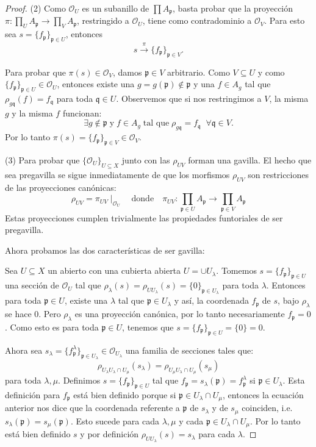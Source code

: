 \documentclass[10pt]{report}
\theoremstyle{plain}\newtheorem{thm}{Teorema}
\theoremstyle{plain}\newtheorem{lem}[thm]{Lema}
\theoremstyle{plain}\newtheorem*{conjecture*}{Conjetura}
\theoremstyle{plain}\newtheorem{cor}[thm]{Corolario}
\theoremstyle{definition}\newtheorem{defin}{Definici\'on}
\theoremstyle{definition}\newtheorem*{defin*}{Definici\'on}
\theoremstyle{remark}\newtheorem{claim}{Proposici\'on}
\theoremstyle{remark}\newtheorem*{claim*}{Proposici\'on}
\theoremstyle{remark}\newtheorem*{eje*}{$\mathbf{Ejercicio}$}
\theoremstyle{remark}\newtheorem{exa}{Ejemplo}
\newcommand{\p}{\mathfrak{p}} %
\newcommand{\q}{\mathfrak{q}} %
\newcommand{\OO}{\mathcal{O}} %
\newcommand{\ra}{\rightarrow}
\begin{document}
\begin{proof}
(2) Como $\OO_U$ es un subanillo de $\prod A_{\p}$, basta probar que la proyecci\'on $\pi:\prod_U A_{\p} \ra \prod_V A_{\p}$,
restringido a $\OO_U$, tiene como contradominio a $\OO_V$. Para esto sea $s=\{f_{\p}\}_{\p\in U}$, entonces
\[
	s \xrightarrow{\pi} \{f_{\p}\}_{\p\in V}.
\]

Para probar que $\pi(s)\in\OO_V$, damos $\p\in V$ arbitrario. Como $V\subseteq U$ y como $\{f_{\p}\}_{\p\in U}\in \OO_U$, entonces
existe una $g=g(\p)\not\in \p$ y una $f\in A_g$ tal que $\rho_{g\q}(f)=f_{\q}$ para toda $\q\in U$. Observemos que si nos
restringimos a $V$, la misma $g$ y la misma $f$ funcionan:
\[
	\exists g\not\in \p\;\text{y}\;f\in A_g \;\text{tal que}\; \rho_{g\q}=f_{\q}\;\; \forall \q\in V.
\]
Por lo tanto $\pi(s)=\{f_{\p}\}_{\p\in V}\in\OO_V$.

(3) Para probar que $\{\OO_U\}_{U\subseteq X}$ junto con las $\rho_{UV}$ forman una gavilla. El hecho que sea pregavilla se sigue
inmediatamente de que los morfismos $\rho_{UV}$ son restricciones de las proyecciones can\'onicas:
\[
	\rho_{UV}=\pi_{UV}\mid_{\OO_U}\quad\text{donde}\quad \pi_{UV}:\prod_{\p\in U}A_{\p} \ra\prod_{\p\in V} A_{\p}
\]
Estas proyecciones cumplen trivialmente las propiedades funtoriales de ser pregavilla.

Ahora probamos las dos caracter\'isticas de ser gavilla:

Sea $U\subseteq X$ un abierto con una cubierta abierta $U=\cup U_{\lambda}$. Tomemos $s=\{f_{\p}\}_{\p\in U}$ una secci\'on
de $\OO_U$ tal que $\rho_{\lambda}(s)=\rho_{U U_{\lambda}}(s)=\{0\}_{\p\in U_{\lambda}}$ para toda $\lambda$. Entonces para
toda $\p\in U$, existe una $\lambda$ tal que $\p\in U_{\lambda}$ y as\'i, la coordenada $f_{\p}$ de $s$, bajo $\rho_{\lambda}$
se hace $0$. Pero $\rho_{\lambda}$ es una proyecci\'on can\'onica, por lo tanto necesariamente $f_{\p}=0$. Como esto es para
toda $\p\in U$, tenemos que $s=\{f_{\p}\}_{\p\in U}=\{0\}=0$.

Ahora sea $s_{\lambda}=\{f_{\p}^{\lambda}\}_{\p\in U_{\lambda}}\in \OO_{U_{\lambda}}$ una familia de secciones tales que:
\[
	\rho_{U_{\lambda} U_{\lambda}\cap U_{\mu}}(s_{\lambda})=\rho_{U_{\mu} U_{\lambda}\cap U_{\mu}}(s_{\mu})
\]
para toda $\lambda,\mu$. Definimos $s=\{f_{\p}\}_{\p\in U}$ tal que $f_{\p}=s_{\lambda}(\p)=f_{\p}^{\lambda}$ si
$\p\in U_{\lambda}$. Esta
definici\'on para $f_{\p}$ est\'a bien definido porque si $\p\in U_{\lambda}\cap U_{\mu}$, entonces la ecuaci\'on anterior
nos dice que la coordenada referente a $\p$ de $s_{\lambda}$ y de $s_{\mu}$ coinciden, i.e. $s_{\lambda}(\p)=s_{\mu}(\p)$.
Esto sucede para cada $\lambda,\mu$ y cada $\p\in U_{\lambda}\cap U_{\mu}$. Por lo tanto est\'a bien definido $s$ y por definici\'on
$\rho_{U U_{\lambda}}(s)=s_{\lambda}$ para cada $\lambda$.


\end{proof}
\end{document}
